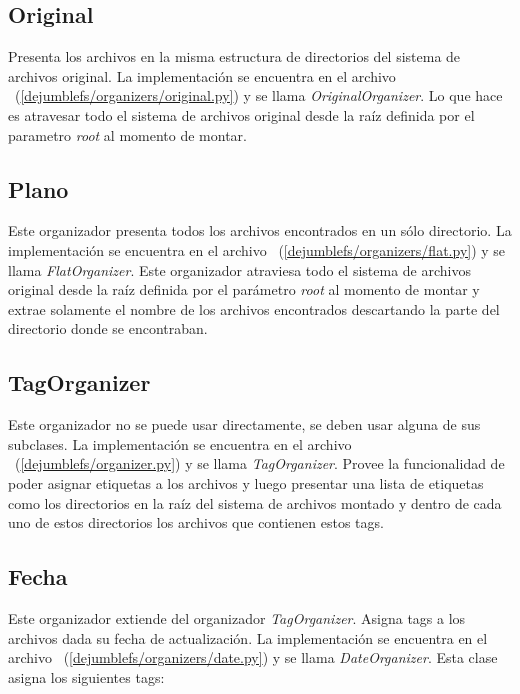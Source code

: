 \subsection{Original}

Presenta los archivos en la misma estructura de directorios del sistema de archivos original. La implementación se encuentra en el archivo ~(\ref{dejumblefs/organizers/original.py}) y se llama \textit{OriginalOrganizer}. Lo que hace es atravesar todo el sistema de archivos original desde la raíz definida por el parametro \textit{root} al momento de montar.

\subsection{Plano}

Este organizador presenta todos los archivos encontrados en un sólo directorio. La implementación se encuentra en el archivo ~(\ref{dejumblefs/organizers/flat.py}) y se llama \textit{FlatOrganizer}. Este organizador atraviesa todo el sistema de archivos original desde la raíz definida por el parámetro \textit{root} al momento de montar y extrae solamente el nombre de los archivos encontrados descartando la parte del directorio donde se encontraban.

\subsection{TagOrganizer}

Este organizador no se puede usar directamente, se deben usar alguna de sus subclases. La implementación se encuentra en el archivo ~(\ref{dejumblefs/organizer.py}) y se llama \textit{TagOrganizer}. Provee la funcionalidad de poder asignar etiquetas a los archivos y luego presentar una lista de etiquetas como los directorios en la raíz del sistema de archivos montado y dentro de cada uno de estos directorios los archivos que contienen estos tags.

\subsection{Fecha}

Este organizador extiende del organizador \textit{TagOrganizer}. Asigna tags a los archivos dada su fecha de actualización. La implementación se encuentra en el archivo ~(\ref{dejumblefs/organizers/date.py}) y se llama \textit{DateOrganizer}. Esta clase asigna los siguientes tags:

